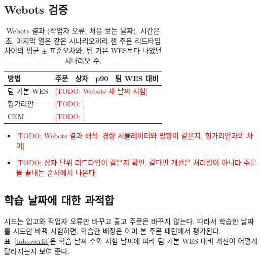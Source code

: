 \documentclass[conference]{IEEEtran}
\newcommand{\todo}[1]{\textcolor{red}{[TODO: #1]}}
\begin{document}
\subsection{Webots 검증}
\label{sec:webots}

\begin{table}[t]
\centering
\caption{Webots 결과 (작업자 오류, 처음 보는 날짜). 시간은 초. 마지막 열은 같은 시나리오끼리 잰 주문 리드타임 차이의 평균 $\pm$ 표준오차와, 팀 기본 WES보다 나았던 시나리오 수.}
\label{tab:webots}
\small
\begin{tabular}{lrrrl}
\toprule
방법 & 주문 & 상자 & p90 & 팀 WES 대비 \\
\midrule
팀 기본 WES & \multicolumn{4}{l}{\todo{Webots 새 날짜 시험}} \\
헝가리안 & \multicolumn{4}{l}{\todo{}} \\
CEM & \multicolumn{4}{l}{\todo{}} \\
\bottomrule
\end{tabular}
\end{table}

\begin{itemize}
  \item \todo{Webots 결과 해석: 경량 시뮬레이터와 방향이 같은지, 헝가리안과의 차이}
  \item \todo{상자 단위 리드타임이 같은지 확인. 같다면 개선은 처리량이 아니라 주문을 끝내는 순서에서 나온다}
\end{itemize}

\subsection{학습 날짜에 대한 과적합}
\label{sec:overfit}
시드는 입고와 작업자 오류만 바꾸고 출고 주문은 바꾸지 않는다.
따라서 학습한 날짜를 시드만 바꿔 시험하면, 학습한 배정은 이미 본 주문 패턴에서 평가된다.
표~\ref{tab:overfit}은 학습 날짜 수와 시험 날짜에 따라 팀 기본 WES 대비 개선이 어떻게 달라지는지 보여 준다.
\end{document}
